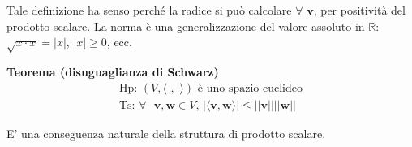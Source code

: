 \documentclass{article}
\begin{document}
Tale definizione ha senso perch\'{e} la radice si pu\`{o} calcolare $\forall 
$ $\mathbf{v}$, per positivit\`{a} del prodotto scalare. La norma \`{e} una
generalizzazione del valore assoluto in $%
\mathbb{R}
$: $\sqrt{x\cdot x}=\left\vert x\right\vert $, $\left\vert x\right\vert \geq
0$, ecc.

\textbf{Teorema (disuguaglianza di Schwarz)}%
\begin{gather*}
\text{Hp}\text{: }\left( V,\langle \_,\_\rangle \right) \text{ \`{e} uno
spazio euclideo} \\
\text{Ts}\text{: }\forall \text{ }\mathbf{v,w}\in V\text{, }\left\vert
\langle \mathbf{v,w\rangle }\right\vert \leq \left\vert \left\vert \mathbf{v}%
\right\vert \right\vert \left\vert \left\vert \mathbf{w}\right\vert
\right\vert 
\end{gather*}

E' una conseguenza naturale della struttura di prodotto scalare.
\end{document}
